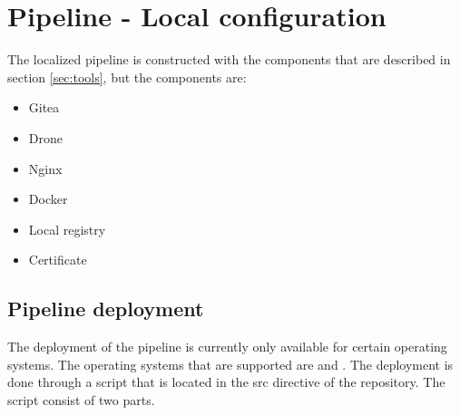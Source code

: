 \section{Pipeline - Local configuration}
\label{sec:pipeline-local}
The localized pipeline is constructed with the components 
that are described in section \ref{sec:tools}, but the components are:

\begin{itemize}
    \item Gitea
    \item Drone
    \item Nginx
    \item Docker
    \item Local registry
    \item Certificate 
\end{itemize}
\subsection{Pipeline deployment}
\label{sec:pipeline-local-deployment}
The deployment of the pipeline is currently only available for certain operating systems. The operating systems that are supported are
 and . The deployment is done through a script  that is located in the src directive of the repository.
The script consist of two parts. 
